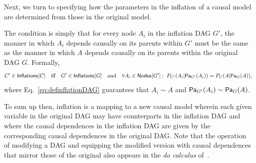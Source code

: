 Next, we turn to specifying how the parameters in the inflation of a causal model are determined from those in the original model.

The condition is simply that for every node $A_i$ in the inflation DAG $G'$, the manner in which $A_i$ depends causally on its parents within $G'$ must be the same as the manner in which $A$ depends causally on its parents within the original DAG $G$.   Formally, 
\begin{align}\label{eq:funcdependences}
C' \in \SmallNamedFunction{Inflations}{C} \quad \text{iff}\quad G' \in\SmallNamedFunction{Inflations}{G}
\quad \text{and} \quad \forall A_i \in \SmallNamedFunction{Nodes}{G'}:\; \pdf[C']{A_i| \Pa[G']{A_i}}=\pdf[C]{A|\Pa[G]{A}},
\end{align}
where Eq.~\eqref{eq:definflationDAG} guarantees that $A_i \sim A$ and $\Pa[G']{A_i} \sim \Pa[G]{A}$.  

To sum up then, inflation is a mapping to a new causal model wherein each given variable in the original DAG may have counterparts in the inflation DAG and where the causal dependences in the inflation DAG are given by the corresponding causal dependences in the original DAG.   Note that the operation of modifying a DAG and equipping the modified version with causal dependences that mirror those of the original also appears in the \emph{do calculus} of~\citet{pearl2009causality}. 



